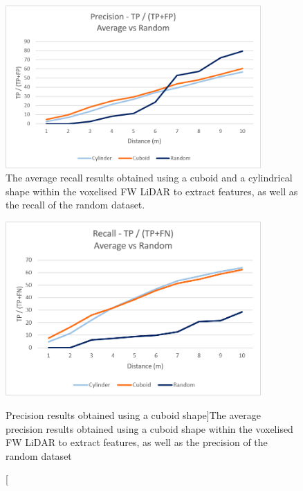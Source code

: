 \documentclass{subfiles}
\begin{document}
           \begin{figure} [h!]
           	\centering
           	\includegraphics[width=0.87\textwidth]{img/dead/results/Precision_AveRan}
           	\caption[The average Recall results and random]{The average recall results obtained using a cuboid and a cylindrical shape within the voxelised FW LiDAR to extract features, as well as the recall of the random dataset. }
           	\label{fig:Precision_AveRan}
           \end{figure}
        
           
           \begin{figure} [h!]
           	\centering
           	\includegraphics[width=0.87\textwidth]{img/dead/results/Recall_AveRan}
           	\caption
           	[Precision results obtained using a cuboid shape]{The average precision results obtained using a cuboid shape within the voxelised FW LiDAR to extract features, as well as the precision of the random dataset}
           	\label{fig:Recall_AveRan}
           \end{figure}
           
\end{document}
